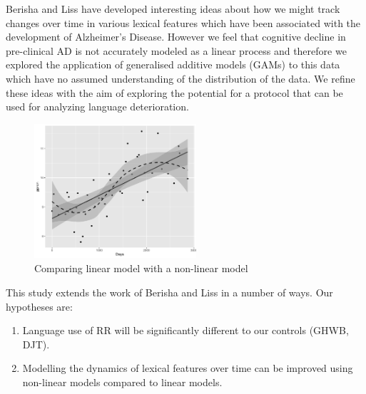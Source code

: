 \documentclass[12pt]{article}
\begin{document}
\par
Berisha and Liss have developed interesting ideas about how we might track changes over time in various lexical features which have been associated with the development of Alzheimer's Disease. However we feel that cognitive decline in pre-clinical AD is not accurately modeled as a linear process and therefore we explored the application of generalised additive models (GAMs) to this data which have no assumed understanding of the distribution of the data. We refine these ideas with the aim of exploring the potential for a protocol that can be used for analyzing language deterioration. 

\begin{figure}[H]
	\centering
	\includegraphics[width=6cm, height=5cm]{plots/comparison1.png}
	\caption{Comparing linear model with a non-linear model}
\end{figure}


This study extends the work of Berisha and Liss in a number of ways. Our hypotheses are:
\begin{enumerate}
	\item Language use of RR will be significantly different to our controls (GHWB, DJT).
	\item Modelling the dynamics of lexical features over time can be improved using non-linear models compared to linear models.
\end{enumerate}
\end{document}
